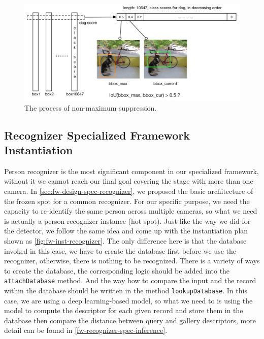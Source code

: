 \begin{figure}
    \includegraphics[width=\linewidth]{figures/framework_detector_nms.png}
    \caption{The process of non-maximum suppression.}
    \label{fig:fw-detector-nms}
\end{figure}

\subsection{Recognizer Specialized Framework Instantiation}
\label{sec:fw-inst-recoginzer}

Person recognizer is the most significant component in our specialized
framework, without it we cannot reach our final goal covering the stage with
more than one camera. In \autoref{sec:fw-design-spec-recognizer}, we proposed the
basic architecture of the frozen spot for a common recognizer. For our specific
purpose, we need the capacity to re-identify the same person across multiple
cameras, so what we need is actually a person recognizer instance (hot spot).
Just like the way we did for the detector, we follow the same idea and come up with
the instantiation plan shown as \autoref{fig:fw-inst-recognizer}. The only
difference here is that the database invoked in this case, we have to create
the database first before we use the recognizer, otherwise, there is nothing to
be recognized. There is a variety of ways to create the database, the corresponding
logic should be added into the \texttt{attachDatabase} method. And the way how
to compare the input and the record within the database should be written in
the method \texttt{lookupDatabase}. In this case, we are using a deep
learning-based model, so what we need to is using the model to compute the
descriptor for each given record and store them in the database then compare the
distance between query and gallery descriptors, more detail can be found in
\autoref{fw-recognizer-spec-inference}.

